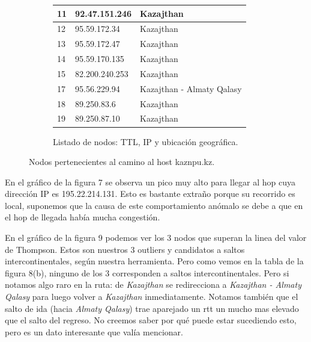 \begin{figure}[ht]
\begin{subfigure}[b]{.39\textwidth}
\begin{tabular}{ l l l }
      11 & 92.47.151.246 & Kazajthan\\ \hline
      12 & 95.59.172.34 & Kazajthan\\ \hline
      13 & 95.59.172.47 & Kazajthan\\ \hline
      14 & 95.59.170.135 & Kazajthan\\ \hline
      15 & 82.200.240.253 & Kazajthan\\ \hline
      17 & 95.56.229.94 & Kazajthan - Almaty Qalasy\\ \hline
      18 & 89.250.83.6 & Kazajthan\\ \hline
      19 & 89.250.87.10 & Kazajthan\\ \hline
      \hline
    \end{tabular}
    \label{fig:kazajthan_list}
    \caption{Listado de nodos: TTL, IP y ubicación geográfica.}
  \end{subfigure}
  \caption{Nodos pertenecientes al camino al host kaznpu.kz.}
\end{figure}

\par En el gráfico de la figura 7 se observa un pico muy alto para llegar al hop cuya dirección IP es 195.22.214.131. Esto es bastante extraño porque su recorrido es local, suponemos que la causa de este comportamiento anómalo se debe a que en el hop de llegada había mucha congestión.
\par En el gráfico de la figura 9 podemos ver los 3 nodos que superan la linea del valor de Thompson. Estos son nuestros 3 outliers y candidatos a saltos intercontinentales, según nuestra herramienta. Pero como vemos en la tabla de la figura 8(b), ninguno de los 3 corresponden a saltos intercontinentales. Pero si notamos algo raro en la ruta: de \textit{Kazajthan} se redirecciona a \textit{Kazajthan - Almaty Qalasy} para luego volver a \textit{Kazajthan} inmediatamente. Notamos también que el salto de ida (hacia \textit{Almaty Qalasy}) trae aparejado un rtt un mucho mas elevado que el salto del regreso. No creemos saber por qué puede estar sucediendo esto, pero es un dato interesante que valía mencionar.

